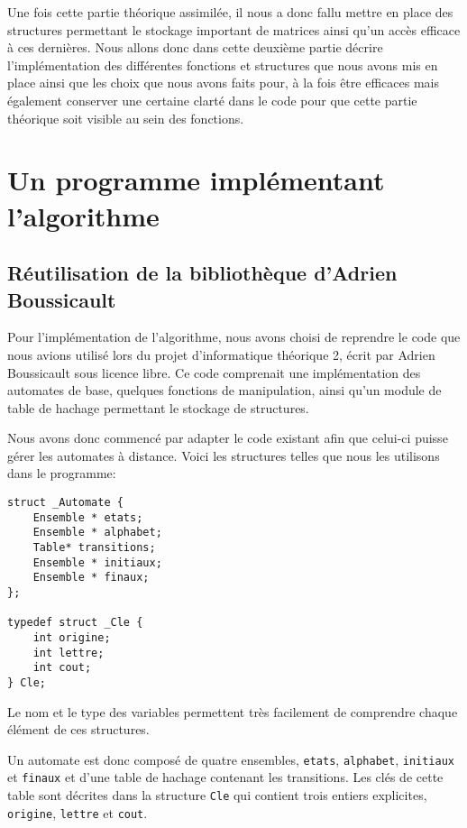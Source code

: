 \documentclass[12pt]{memoir}
\begin{document}
\bigskip
Une fois cette partie théorique assimilée, il nous a donc fallu mettre en place des structures permettant le stockage important de matrices ainsi qu'un accès efficace à ces dernières. Nous allons donc dans cette deuxième partie décrire l'implémentation des différentes fonctions et structures que nous avons mis en place ainsi que les choix que nous avons faits pour, à la fois être efficaces mais également conserver une certaine clarté dans le code pour que cette partie théorique soit visible au sein des fonctions. 

\chapter{Un programme implémentant l'algorithme}

\section{Réutilisation de la bibliothèque d'Adrien Boussicault}
Pour l'implémentation de l'algorithme, nous avons choisi de reprendre le code
que nous avions utilisé lors du projet d'informatique théorique 2, écrit par
Adrien Boussicault sous licence libre. Ce code
comprenait une implémentation des automates de base, quelques fonctions de
manipulation, ainsi qu'un module de table de hachage permettant le stockage de
structures.


Nous avons donc commencé par adapter le code existant afin que celui-ci puisse gérer les automates à distance. Voici les structures telles que nous les utilisons dans le programme:\\

\begin{lstlisting}[frame=single]
struct _Automate {
	Ensemble * etats;
	Ensemble * alphabet;
	Table* transitions;
	Ensemble * initiaux;
	Ensemble * finaux;
};

typedef struct _Cle {
	int origine;
	int lettre;
	int cout;
} Cle;
\end{lstlisting}
$ $\\
Le nom et le type des variables permettent très facilement de comprendre chaque élément de ces structures. 

Un automate est donc composé de quatre ensembles, \verb?etats?, \verb?alphabet?, \verb?initiaux? et \verb?finaux? et d'une table de hachage contenant les transitions. Les clés de cette table sont décrites dans la structure \verb?Cle? qui contient trois entiers explicites, \verb?origine?, \verb?lettre? et \verb?cout?.
\end{document}
